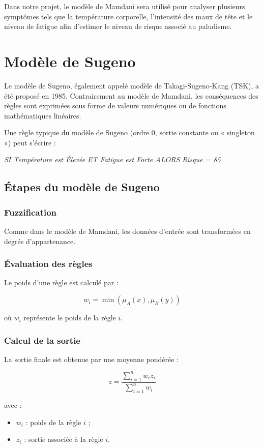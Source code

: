 \documentclass[a4paper,12pt]{report} %
\begin{document}
Dans notre projet, le modèle de Mamdani sera utilisé pour analyser plusieurs symptômes tels que la température corporelle, l'intensité des maux de tête et le niveau de fatigue afin d'estimer le niveau de risque associé au paludisme.

\section{Modèle de Sugeno}

Le modèle de Sugeno, également appelé modèle de Takagi-Sugeno-Kang (TSK), a été proposé en 1985. Contrairement au modèle de Mamdani, les conséquences des règles sont exprimées sous forme de valeurs numériques ou de fonctions mathématiques linéaires.

Une règle typique du modèle de Sugeno (ordre 0, sortie constante ou « singleton ») peut s'écrire :

\begin{center}
\textit{SI Température est Élevée ET Fatigue est Forte ALORS Risque = 85}
\end{center}

\subsection{Étapes du modèle de Sugeno}

\subsubsection{Fuzzification}
Comme dans le modèle de Mamdani, les données d'entrée sont transformées en degrés d'appartenance.

\subsubsection{Évaluation des règles}
Le poids d'une règle est calculé par :

\[
w_i = \min(\mu_A(x), \mu_B(y))
\]

où \(w_i\) représente le poids de la règle \(i\).

\subsubsection{Calcul de la sortie}
La sortie finale est obtenue par une moyenne pondérée :

\[
z = \frac{\sum_{i=1}^{n} w_i z_i}{\sum_{i=1}^{n} w_i}
\]

avec :
\begin{itemize}
\item \(w_i\) : poids de la règle \(i\) ;
\item \(z_i\) : sortie associée à la règle \(i\).
\end{itemize}
\end{document}
